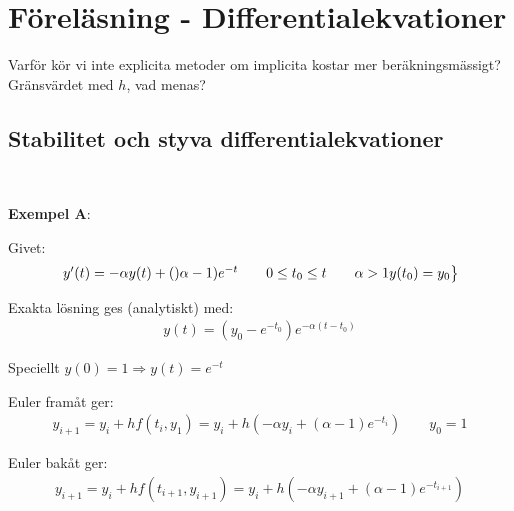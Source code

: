 \section{Föreläsning - Differentialekvationer}
\par\bigskip
\noindent Varför kör vi inte explicita metoder om implicita kostar mer beräkningsmässigt? Gränsvärdet med $h$, vad menas?
\par\bigskip
\subsection{Stabilitet och styva differentialekvationer}\hfill\\
\par\bigskip
\noindent \textbf{Exempel A}:
\par\bigskip
\noindent Givet:
\begin{equation*}
  \begin{gathered}
    \begin{rcases*}
      y^{\prime}(t)=-\alpha y(t)+()\alpha-1)e^{-t}\qquad 0\leq t_0\leq t\qquad\alpha > 1
      y(t_0)=y_0
    \end{rcases*}
  \end{gathered}
\end{equation*}
\par\bigskip
\noindent Exakta lösning ges (analytiskt) med:
\begin{equation*}
  \begin{gathered}
    y(t) = (y_0-e^{-t_0})e^{-\alpha(t-t_0)}
  \end{gathered}
\end{equation*}\par
\noindent Speciellt $y(0)=1\Rightarrow y(t)=e^{-t}$
\par\bigskip
\noindent Euler framåt ger:
\begin{equation*}
  \begin{gathered}
    y_{i+1} = y_i +hf(t_i,y_1) = y_i+h\left(-\alpha y_i+(\alpha-1)e^{-t_i}\right)\qquad y_0=1
  \end{gathered}
\end{equation*}
\par\bigskip
\noindent Euler bakåt ger:
\begin{equation*}
  \begin{gathered}
    y_{i+1} = y_i + hf(t_{i+1}, y_{i+1}) = y_i+h\left(-\alpha y_{i+1}+(\alpha-1)e^{-t_{i+1}}\right)
  \end{gathered}
\end{equation*}
\par\bigskip
